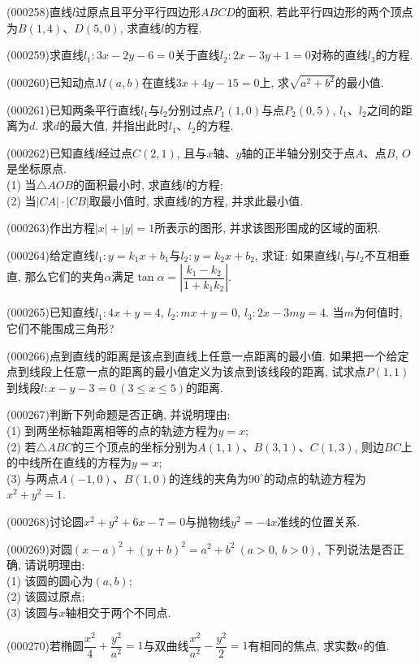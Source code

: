\item (000258)直线$l$过原点且平分平行四边形$ABCD$的面积, 若此平行四边形的两个顶点为$B(1, 4)$、$D(5, 0)$, 求直线$l$的方程.
\item (000259)求直线$l_1: 3x-2y-6=0$关于直线$l_2: 2x-3y+1=0$对称的直线$l_3$的方程.
\item (000260)已知动点$M(a, b)$在直线$3x+4y-15=0$上, 求$\sqrt{a^2+b^2}$的最小值.
\item (000261)已知两条平行直线$l_1$与$l_2$分别过点$P_1(1, 0)$与点$P_2(0, 5)$, $l_1$、$l_2$之间的距离为$d$. 求$d$的最大值, 并指出此时$l_1$、$l_2$的方程.
\item (000262)已知直线$l$经过点$C(2, 1)$, 且与$x$轴、$y$轴的正半轴分别交于点$A$、点$B$, $O$是坐标原点.\\
(1) 当$\triangle AOB$的面积最小时, 求直线$l$的方程;\\
(2) 当$|CA|\cdot |CB|$取最小值时, 求直线$l$的方程, 并求此最小值.
\item (000263)作出方程$|x|+|y|=1$所表示的图形, 并求该图形围成的区域的面积.
\item (000264)给定直线$l_1: y=k_1x+b_1$与$l_2: y=k_2x+b_2$, 求证: 如果直线$l_1$与$l_2$不互相垂直, 那么它们的夹角$\alpha$满足$\tan \alpha=|\dfrac{k_1-k_2}{1+k_1k_2}|$.
\item (000265)已知直线$l_1: 4x+y=4$, $l_2: mx+y=0$, $l_3: 2x-3my=4$. 当$m$为何值时, 它们不能围成三角形?
\item (000266)点到直线的距离是该点到直线上任意一点距离的最小值. 如果把一个给定点到线段上任意一点的距离的最小值定义为该点到该线段的距离, 试求点$P(1, 1)$到线段$l: x-
y-3=0 \ (3\le x\le 5)$的距离.
\item (000267)判断下列命题是否正确, 并说明理由:\\
(1) 到两坐标轴距离相等的点的轨迹方程为$y=x$;\\
(2) 若$\triangle ABC$的三个顶点的坐标分别为$A(1, 1)$、$B(3, 1)$、$C(1, 3)$, 则边$BC$上的中线所在直线的方程为$y=x$;\\
(3) 与两点$A(-1, 0)$、$B(1, 0)$的连线的夹角为$90^\circ$的动点的轨迹方程为$x^2+y^2=1$.
\item (000268)讨论圆$x^2+y^2+6x-7=0$与抛物线$y^2=-4x$准线的位置关系.
\item (000269)对圆$(x-a)^2+(y+b)^2=a^2+b^2\ (a>0, \ b>0)$, 下列说法是否正确, 请说明理由:\\
(1) 该圆的圆心为$(a, b)$;\\
(2) 该圆过原点;\\
(3) 该圆与$x$轴相交于两个不同点.
\item (000270)若椭圆$\dfrac{x^2}{4}+\dfrac{y^2}{a^2}=1$与双曲线$\dfrac{x^2}{a^2}-\dfrac{y^2}2=1$有相同的焦点, 求实数$a$的值.
